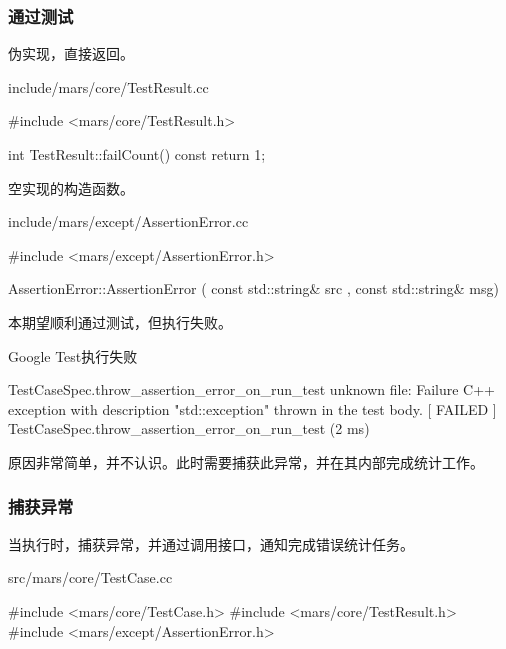 \begin{content}
\subsubsection{通过测试}

伪实现，直接返回。

\begin{nodiff}{include/mars/core/TestResult.cc}
 \begin{c++}
#include <mars/core/TestResult.h>

int TestResult::failCount() const {
  return 1;
}
 \end{c++}
\end{nodiff}

空实现的构造函数。

\begin{nodiff}{include/mars/except/AssertionError.cc}
 \begin{c++}
#include <mars/except/AssertionError.h>

AssertionError::AssertionError
  ( const std::string& src
  , const std::string& msg) {}
 \end{c++}
\end{nodiff}

本期望顺利通过测试，但执行失败。

\begin{nodiff}{Google Test执行失败}
 \begin{c++}
[ RUN      ] TestCaseSpec.throw_assertion_error_on_run_test
unknown file: Failure
C++ exception with description "std::exception" thrown in the test body.
[  FAILED  ] TestCaseSpec.throw_assertion_error_on_run_test (2 ms)
 \end{c++}
\end{nodiff}

原因非常简单，并不认识。此时需要捕获此异常，并在其内部完成统计工作。

\subsubsection{捕获异常}

当执行时，捕获异常，并通过调用接口，通知完成错误统计任务。

\begin{nodiff}{src/mars/core/TestCase.cc}
 \begin{c++}
#include <mars/core/TestCase.h>
#include <mars/core/TestResult.h>
#include <mars/except/AssertionError.h>


\end{c++}
\end{nodiff}
\end{content}
